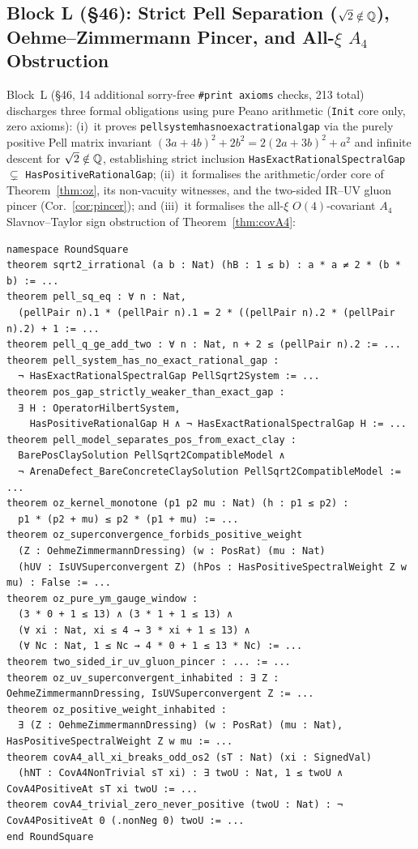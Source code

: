 \documentclass[11pt,a4paper]{article}
\theoremstyle{plain}
\theoremstyle{definition}
\theoremstyle{remark}
\renewcommand{\_}{\oldunderscore\allowbreak}
\newcommand{\Lean}[1]{\texttt{\small #1}}
\begin{document}
\subsection{Block L (\S46): Strict Pell Separation (\texorpdfstring{$\sqrt{2}\notin\mathbb{Q}$}{sqrt(2) not in Q}), Oehme--Zimmermann Pincer, and All-\texorpdfstring{$\xi$}{xi} \texorpdfstring{$A_4$}{A4} Obstruction}
Block~L (\S46, 14 additional sorry-free \texttt{\#print axioms} checks, 213 total) discharges three formal obligations using pure Peano arithmetic (\texttt{Init} core only, zero axioms): (i)~it proves \Lean{pell\_system\_has\_no\_exact\_rational\_gap} via the purely positive Pell matrix invariant $(3a+4b)^2+2b^2=2(2a+3b)^2+a^2$ and infinite descent for $\sqrt{2}\notin\mathbb{Q}$, establishing strict inclusion \Lean{HasExactRationalSpectralGap} $\subsetneq$ \Lean{HasPositiveRationalGap}; (ii)~it formalises the arithmetic/order core of Theorem~\ref{thm:oz}, its non-vacuity witnesses, and the two-sided IR--UV gluon pincer (Cor.~\ref{cor:pincer}); and (iii)~it formalises the all-$\xi$ $O(4)$-covariant $A_4$ Slavnov--Taylor sign obstruction of Theorem~\ref{thm:covA4}:
\begin{lstlisting}
namespace RoundSquare
theorem sqrt2_irrational (a b : Nat) (hB : 1 ≤ b) : a * a ≠ 2 * (b * b) := ...
theorem pell_sq_eq : ∀ n : Nat,
  (pellPair n).1 * (pellPair n).1 = 2 * ((pellPair n).2 * (pellPair n).2) + 1 := ...
theorem pell_q_ge_add_two : ∀ n : Nat, n + 2 ≤ (pellPair n).2 := ...
theorem pell_system_has_no_exact_rational_gap :
  ¬ HasExactRationalSpectralGap PellSqrt2System := ...
theorem pos_gap_strictly_weaker_than_exact_gap :
  ∃ H : OperatorHilbertSystem,
    HasPositiveRationalGap H ∧ ¬ HasExactRationalSpectralGap H := ...
theorem pell_model_separates_pos_from_exact_clay :
  BarePosClaySolution PellSqrt2CompatibleModel ∧
  ¬ ArenaDefect_BareConcreteClaySolution PellSqrt2CompatibleModel := ...
theorem oz_kernel_monotone (p1 p2 mu : Nat) (h : p1 ≤ p2) :
  p1 * (p2 + mu) ≤ p2 * (p1 + mu) := ...
theorem oz_superconvergence_forbids_positive_weight
  (Z : OehmeZimmermannDressing) (w : PosRat) (mu : Nat)
  (hUV : IsUVSuperconvergent Z) (hPos : HasPositiveSpectralWeight Z w mu) : False := ...
theorem oz_pure_ym_gauge_window :
  (3 * 0 + 1 ≤ 13) ∧ (3 * 1 + 1 ≤ 13) ∧
  (∀ xi : Nat, xi ≤ 4 → 3 * xi + 1 ≤ 13) ∧
  (∀ Nc : Nat, 1 ≤ Nc → 4 * 0 + 1 ≤ 13 * Nc) := ...
theorem two_sided_ir_uv_gluon_pincer : ... := ...
theorem oz_uv_superconvergent_inhabited : ∃ Z : OehmeZimmermannDressing, IsUVSuperconvergent Z := ...
theorem oz_positive_weight_inhabited :
  ∃ (Z : OehmeZimmermannDressing) (w : PosRat) (mu : Nat), HasPositiveSpectralWeight Z w mu := ...
theorem covA4_all_xi_breaks_odd_os2 (sT : Nat) (xi : SignedVal)
  (hNT : CovA4NonTrivial sT xi) : ∃ twoU : Nat, 1 ≤ twoU ∧ CovA4PositiveAt sT xi twoU := ...
theorem covA4_trivial_zero_never_positive (twoU : Nat) : ¬ CovA4PositiveAt 0 (.nonNeg 0) twoU := ...
end RoundSquare
\end{lstlisting}
\end{document}
